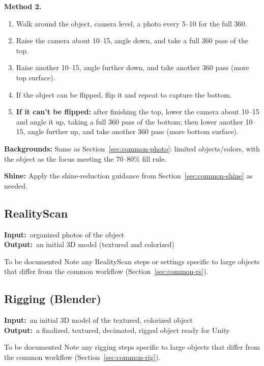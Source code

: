\documentclass[11pt]{article}
\newcommand{\inout}[2]{%
    \begin{stageio}%
    \textbf{Input:}~#1\\[2pt]%
    \textbf{Output:}~#2%
    \end{stageio}%
}
\begin{document}
\textbf{Method 2.}
\begin{enumerate}[leftmargin=1.6em]
  \item Walk around the object, camera level, a photo every 5--10\textdegree{} for the full 360\textdegree.
  \item Raise the camera about 10--15\textdegree{}, angle down, and take a full 360\textdegree{} pass of the top.
  \item Raise another 10--15\textdegree{}, angle further down, and take another 360\textdegree{} pass (more top surface).
  \item If the object can be flipped, flip it and repeat to capture the bottom.
  \item \textbf{If it can't be flipped:} after finishing the top, lower the camera about 10--15\textdegree{} and angle it up, taking a full 360\textdegree{} pass of the bottom; then lower another 10--15\textdegree{}, angle further up, and take another 360\textdegree{} pass (more bottom surface).
\end{enumerate}

\textbf{Backgrounds:} Same as Section~\ref{sec:common-photo}: limited objects/colors, with the object as the focus meeting the 70--80\% fill rule.

\textbf{Shine:} Apply the shine-reduction guidance from Section~\ref{sec:common-shine} as needed.

\subsection{RealityScan}
\inout{organized photos of the object}{an initial 3D model (textured and colorized)}
\begin{todobox}{To be documented}
Note any RealityScan steps or settings specific to large objects that differ from the common workflow (Section~\ref{sec:common-rs}).
\end{todobox}

\subsection{Rigging (Blender)}
\inout{an initial 3D model of the textured, colorized object}{a finalized, textured, decimated, rigged object ready for Unity}
\begin{todobox}{To be documented}
Note any rigging steps specific to large objects that differ from the common workflow (Section~\ref{sec:common-rig}).
\end{todobox}
\end{document}
